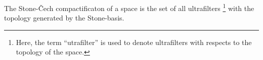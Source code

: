 \documentclass[12pt]{article}
\begin{document}
The Stone-\v Cech compactificaton of a space  is the set of all ultrafilters 
\footnote{Here, the term ``utrafilter'' is used to denote ultrafilters with 
respects to the topology of the space.} with the topology generated by the Stone-basis.
\end{document}
